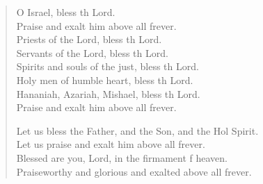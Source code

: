 \begin{verse}
\begin{patverse}
O Israel, bless th Lord.\Med\\
Praise and exalt him above all frever.\\
Priests of the Lord, bless th Lord.\Med\\
Servants of the Lord, bless th Lord.\\
Spirits and souls of the just, bless th Lord.\Med\\
Holy men of humble heart, bless th Lord.\\
Hananiah, Azariah, Mishael, bless th Lord.\Med\\
Praise and exalt him above all frever.

Let us bless the Father, and the Son, and the Hol Spirit.\Med\\
Let us praise and exalt him above all frever.\\
Blessed are you, Lord, in the firmament f heaven.\Med\\
Praiseworthy and glorious and exalted above all frever.
  \end{patverse}
\end{verse}
